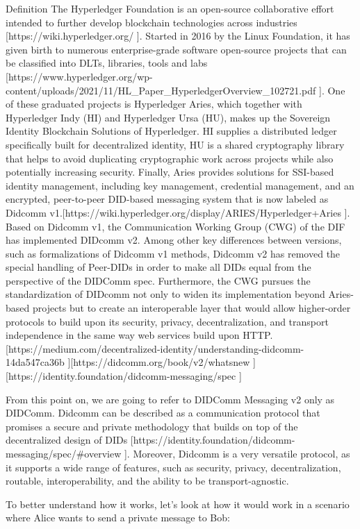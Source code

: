 Definition
The Hyperledger Foundation is an open-source collaborative effort intended to further develop blockchain technologies across industries [https://wiki.hyperledger.org/ ]. Started in 2016 by the Linux Foundation, it has given birth to numerous enterprise-grade software open-source projects that can be classified into DLTs, libraries, tools and labs [https://www.hyperledger.org/wp-content/uploads/2021/11/HL_Paper_HyperledgerOverview_102721.pdf ]. One of these graduated projects is Hyperledger Aries, which together with Hyperledger Indy (HI) and Hyperledger Ursa (HU), makes up the Sovereign Identity Blockchain Solutions of Hyperledger. HI supplies a distributed ledger specifically built for decentralized identity, HU is a shared cryptography library that helps to avoid duplicating cryptographic work across projects while also potentially increasing security. Finally, Aries provides solutions for SSI-based identity management, including key management, credential management, and an encrypted, peer-to-peer DID-based messaging system that is now labeled as Didcomm v1.[https://wiki.hyperledger.org/display/ARIES/Hyperledger+Aries ]. 
Based on Didcomm v1, the Communication Working Group (CWG) of the DIF has implemented DIDcomm v2. Among other key differences between versions, such as formalizations of Didcomm v1 methods, Didcomm v2 has removed the special handling of Peer-DIDs in order to make all DIDs equal from the perspective of the DIDComm spec. Furthermore, the CWG pursues the standardization of DIDcomm not only to widen its implementation beyond Aries-based projects but to create an interoperable layer that would allow higher-order protocols to build upon its security, privacy, decentralization, and transport independence in the same way web services build upon HTTP.  [https://medium.com/decentralized-identity/understanding-didcomm-14da547ca36b ][https://didcomm.org/book/v2/whatsnew ]
[https://identity.foundation/didcomm-messaging/spec ]

From this point on, we are going to refer to DIDComm Messaging v2 only as DIDComm. Didcomm can be described as a communication protocol that promises a secure and private methodology that builds on top of the decentralized design of DIDs [https://identity.foundation/didcomm-messaging/spec/#overview ]. Moreover, Didcomm is a very versatile protocol, as it supports a wide range of features, such as security, privacy, decentralization, routable, interoperability, and the ability to be transport-agnostic.

To better understand how it works, let's look at how it would work in a scenario where Alice wants to send a private message to Bob: 


